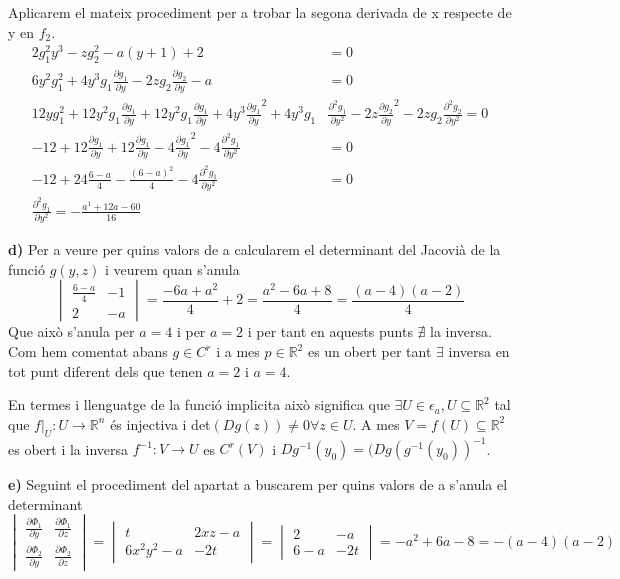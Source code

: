 \documentclass[12pt, a4papre]{article}
\begin{document}
	Aplicarem el mateix procediment per a trobar la segona derivada de x respecte de y en $f_2$.
	\begin{equation}
	\begin{split}
	2g_1^2y^3-zg_2^2-a(y+1)+2&=0\\
	6y^2g_1^2+4y^3g_1\frac{\partial g_1}{\partial y}-2zg_2\frac{\partial g_2}{\partial y}-a&=0\\
	12yg_1^2+12y^2g_1\frac{\partial g_1}{\partial y}+12y^2g_1\frac{\partial g_1}{\partial y}
	+4y^3\frac{\partial g_1}{\partial y}^2+4y^3g_1&\frac{\partial^2 g_1}{\partial y^2}-2z\frac{\partial g_2}{\partial y}^2
	-2zg_2\frac{\partial^2 g_2}{\partial y^2}=0\\
	-12+12\frac{\partial g_1}{\partial y}+12\frac{\partial g_1}{\partial y}-4\frac{\partial g_1}{\partial y}^2-4
	\frac{\partial^2 g_1}{\partial y^2}&=0\\
	-12+24\frac{6-a}{4}-\frac{(6-a)^2}{4}-4\frac{\partial^2 g_1}{\partial y^2}&=0\\
	\frac{\partial^2 g_1}{\partial y^2}=-\frac{a^1+12a-60}{16}
	\end{split}
	\end{equation}
	
	\textbf{d)}  Per a veure per quins valors de a calcularem el determinant del Jacovià de la funció $g(y,z)$ i veurem quan s'anula
	\[
	\begin{vmatrix}
		\frac{	6-a}{4}	&-1\\
		2			&-a
	\end{vmatrix}
	=
	\frac{	-6a+a^2}{4}+2=\frac{a^2-6a+8}{4}=\frac{(a-4)(a-2)}{4}
	\]
	Que això s'anula per $a=4$ i per $a=2$ i per tant en aquests punts $\nexists$ la inversa. Com hem comentat abans $g\in C^r$ i a mes 
	$p\in \mathbb{R}^2$ es un obert per tant $\exists$ inversa en tot punt diferent dels que tenen $a=2$ i $a=4$.
	
	En termes i llenguatge de la funció implicita això significa que $\exists U\in \epsilon_a, U\subseteq \mathbb{R}^2$ tal que 
	$f|_U:U \rightarrow \mathbb{R}^n$ és injectiva i det$(Dg(z))\ne 0 \forall z \in U.$ A mes $V =f(U) \subseteq \mathbb{R}^2$ es obert i la inversa
	$f^{-1}:V \rightarrow U$ es $C^r(V)$ i $Dg^{-1}(y_0)=(Dg(g^{-1}(y_0))^{-1}$.
	
	\textbf{e)} Seguint el procediment del apartat a buscarem per quins valors de a s'anula el determinant
	\[
	\begin{vmatrix}
		\frac{\partial \Phi_1}{\partial y} 	&\frac{\partial \Phi_1}{\partial z}\\
		\frac{\partial \Phi_2}{\partial y} 	&\frac{\partial \Phi_2}{\partial z}
	\end{vmatrix}
	=
	\begin{vmatrix}
		t		&2xz-a\\
		6x^2y^2-a	&-2t
	\end{vmatrix}
	=
	\begin{vmatrix}
		2		&-a\\
		6-a		&-2t
	\end{vmatrix}
	=-a^2+6a-8=-(a-4)(a-2)
	\]
	
\end{document}
